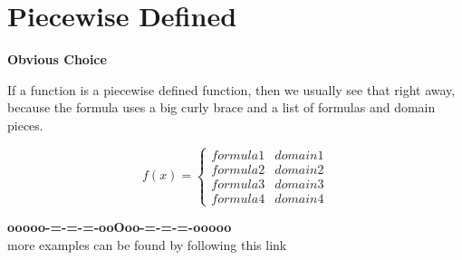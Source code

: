 \documentclass{ximera}
\begin{document}
\section*{Piecewise Defined}


\textbf{\textcolor{purple!85!blue}{Obvious Choice}} 

If a function is a piecewise defined function, then we usually see that right away, because the formula uses a big curly brace and a list of formulas and domain pieces.




\[
f(x) = 
\begin{cases}
  formula 1 & domain 1  \\
  formula 2 & domain 2  \\
  formula 3 & domain 3  \\
  formula 4 & domain 4  
\end{cases}
\]










\begin{center}
\textbf{\textcolor{green!50!black}{ooooo-=-=-=-ooOoo-=-=-=-ooooo}} \\

more examples can be found by following this link\\ 

\end{center}
\end{document}
